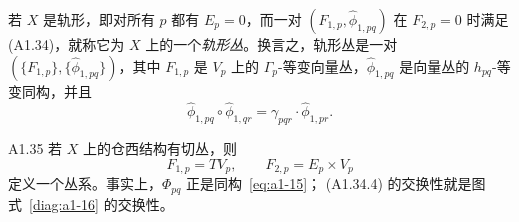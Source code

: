 若 $X$ 是轨形，即对所有 $p$ 都有 $E_p=0$，而一对
$(F_{1,p},\widehat\phi_{1,pq})$ 在 $F_{2,p}=0$ 时满足 (A1.34)，就称它为
$X$ 上的一个\emph{轨形丛}。换言之，轨形丛是一对
$(\{F_{1,p}\},\{\widehat\phi_{1,pq}\})$，其中 $F_{1,p}$ 是 $V_p$ 上的
$\Gamma_p$-等变向量丛，$\widehat\phi_{1,pq}$ 是向量丛的
$h_{pq}$-等变同构，并且
\[
 \widehat\phi_{1,pq}\circ\widehat\phi_{1,qr}
 =\gamma_{pqr}\cdot\widehat\phi_{1,pr}.
\]

\begin{example}{A1.35}\label{ex:a1-35}
若 $X$ 上的仓西结构有切丛，则
\[
 F_{1,p}=TV_p,
 \qquad
 F_{2,p}=E_p\times V_p
\]
定义一个丛系。事实上，$\Phi_{pq}$ 正是同构~\eqref{eq:a1-15}；
(A1.34.4) 的交换性就是图式~\eqref{diag:a1-16} 的交换性。
\end{example}
